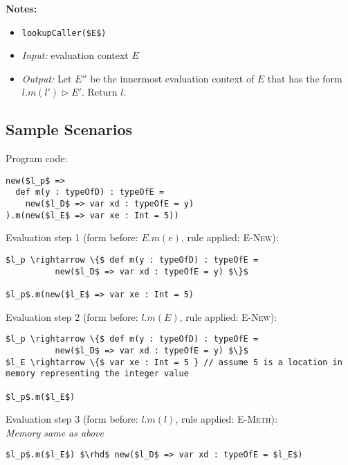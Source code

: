 \documentclass{llncs}
\begin{document}
\noindent\textbf{Notes:}

\begin{itemize}
\item \lstinline{lookupCaller($E$)}
\item[] \emph{Input:} evaluation context $E$
\item[] \emph{Output:} Let $E''$ be the innermost evaluation context of $E$ that has the form $l.m(l') \rhd E'$. Return $l$.
\end{itemize}


\newpage

\subsection{Sample Scenarios}

\noindent\underline{}

\vspace{16pt}

\noindent Program code:
\vspace{-6pt}
\begin{lstlisting}[xleftmargin=20pt]
new($l_p$ =>
  def m(y : typeOfD) : typeOfE =
    new($l_D$ => var xd : typeOfE = y)
).m(new($l_E$ => var xe : Int = 5))
\end{lstlisting}

\vspace{12pt}
\noindent Evaluation step 1 (form before: $E.m(e)$, rule applied: \textsc{E-New}):
\vspace{-6pt}
\begin{lstlisting}[xleftmargin=20pt]
$l_p \rightarrow \{$ def m(y : typeOfD) : typeOfE =
          new($l_D$ => var xd : typeOfE = y) $\}$

$l_p$.m(new($l_E$ => var xe : Int = 5)
\end{lstlisting}

\vspace{12pt}
\noindent Evaluation step 2 (form before: $l.m(E)$, rule applied: \textsc{E-New}):
\vspace{-6pt}
\begin{lstlisting}[xleftmargin=20pt]
$l_p \rightarrow \{$ def m(y : typeOfD) : typeOfE =
          new($l_D$ => var xd : typeOfE = y) $\}$
$l_E \rightarrow \{$ var xe : Int = 5 } // assume 5 is a location in memory representing the integer value

$l_p$.m($l_E$)
\end{lstlisting}

\vspace{12pt}
\noindent Evaluation step 3 (form before: $l.m(l)$, rule applied: \textsc{E-Meth}):\\
\vspace{-6pt}
\indent\textit{Memory same as above}\\
\vspace{-6pt}
\begin{lstlisting}[xleftmargin=20pt]
$l_p$.m($l_E$) $\rhd$ new($l_D$ => var xd : typeOfE = $l_E$)
\end{lstlisting}
\end{document}

